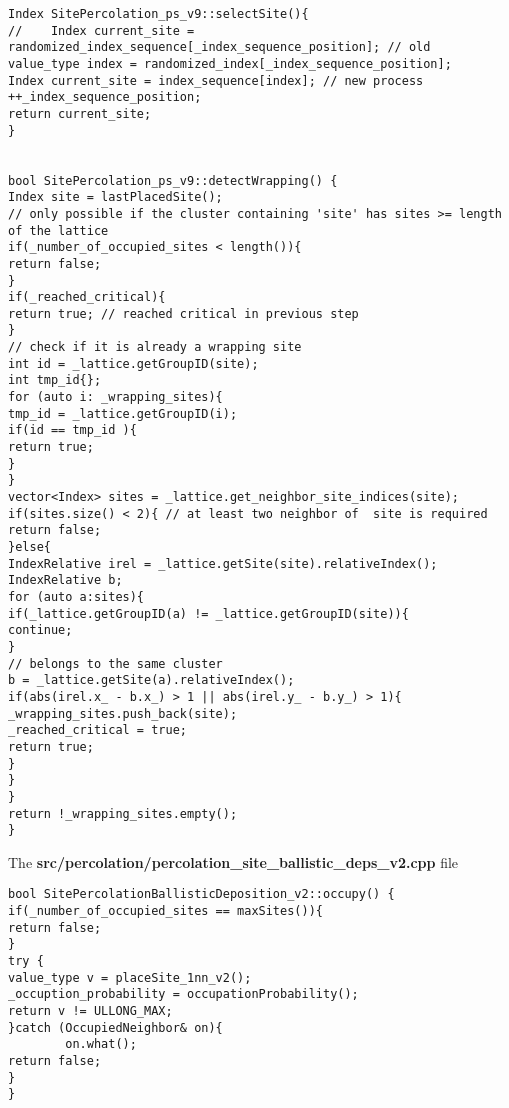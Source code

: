 \begin{lstlisting}[style=CStyle]
Index SitePercolation_ps_v9::selectSite(){
//    Index current_site = randomized_index_sequence[_index_sequence_position]; // old
value_type index = randomized_index[_index_sequence_position];
Index current_site = index_sequence[index]; // new process
++_index_sequence_position;
return current_site;
}


bool SitePercolation_ps_v9::detectWrapping() {
Index site = lastPlacedSite();
// only possible if the cluster containing 'site' has sites >= length of the lattice
if(_number_of_occupied_sites < length()){
return false;
}
if(_reached_critical){
return true; // reached critical in previous step
}
// check if it is already a wrapping site
int id = _lattice.getGroupID(site);
int tmp_id{};
for (auto i: _wrapping_sites){
tmp_id = _lattice.getGroupID(i);
if(id == tmp_id ){
return true;
}
}
vector<Index> sites = _lattice.get_neighbor_site_indices(site);
if(sites.size() < 2){ // at least two neighbor of  site is required
return false;
}else{
IndexRelative irel = _lattice.getSite(site).relativeIndex();
IndexRelative b;
for (auto a:sites){
if(_lattice.getGroupID(a) != _lattice.getGroupID(site)){
continue;
}
// belongs to the same cluster
b = _lattice.getSite(a).relativeIndex();
if(abs(irel.x_ - b.x_) > 1 || abs(irel.y_ - b.y_) > 1){
_wrapping_sites.push_back(site);
_reached_critical = true;
return true;
}
}
}
return !_wrapping_sites.empty();
}

\end{lstlisting}

The \textbf{src/percolation/percolation\_site\_ballistic\_deps\_v2.cpp} file

\begin{lstlisting}[style=CStyle]
bool SitePercolationBallisticDeposition_v2::occupy() {
if(_number_of_occupied_sites == maxSites()){
return false;
}
try {
value_type v = placeSite_1nn_v2();
_occuption_probability = occupationProbability();
return v != ULLONG_MAX;
}catch (OccupiedNeighbor& on){
        on.what();
return false;
}
}
\end{lstlisting}
